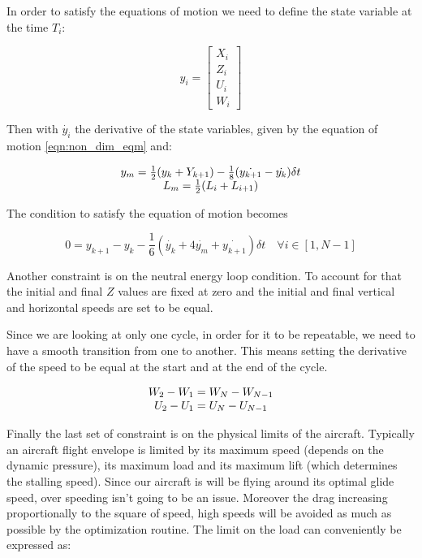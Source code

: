 In order to satisfy the equations of motion we need to define the state variable at the time $T_i$:

\begin{equation}
	y_i= \begin{bmatrix}
		X_i \\
		Z_i \\
		U_i \\
		W_i 
	\end{bmatrix}
	\label{eqn:state_i}
\end{equation}

Then with $\dot{y_i}$ the derivative of the state variables, given by the equation of motion \ref{eqn:non_dim_eqm} and:

\begin{equation}
	\begin{array}[c]{c}
		y_m= \frac{1}{2}(y_k + Y_{k+1}) - \frac{1}{8}(\dot{y_{k+1}} - \dot{y_k})\delta t \\
		L_m=\frac{1}{2}(L_i + L_{i+1})
	\end{array}
	\label{eqn:simpson_middle}
\end{equation}

The condition to satisfy the equation of motion becomes

\begin{equation}
	0=y_{k+1} - y_k - \frac{1}{6}( \dot{y_k} + 4 \dot{y_m} + \dot{y_{k+1}})\delta t \quad \forall i \in [1,N-1]
	\label{eqn:simpson}
\end{equation}

\par Another constraint is on the neutral energy loop condition.
To account for that the initial and final $Z$ values are fixed at zero and the initial and final vertical and horizontal speeds are set to be equal.

\par Since we are looking at only one cycle, in order for it to be repeatable, we need to have a smooth transition from one to another.
This  means setting the derivative of the speed to be equal at the start and at the end of the cycle.

\begin{equation}
	\begin{array}[c]{c}
		W_2 - W_1 = W_N - W_{N-1} \\
		U_2 - U_1 = U_N - U_{N-1} 
	\end{array}
	\label{eqn:derivative_constraint}
\end{equation}

\par Finally the last set of constraint is on the physical limits of the aircraft.
Typically an aircraft flight envelope is limited by its maximum speed (depends on the dynamic pressure), its maximum load and its maximum lift (which determines the stalling speed).
Since our aircraft is will be flying around its optimal glide speed, over speeding isn't going to be an issue.
Moreover the drag increasing proportionally to the square of speed, high speeds will be avoided as much as possible by the optimization routine.
The limit on the load can conveniently be expressed as:


